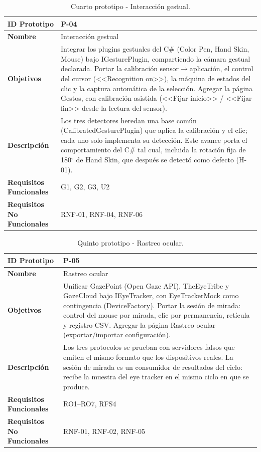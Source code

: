 \begin{table}[H]
\centering
\caption{Cuarto prototipo - Interacción gestual.}
\label{tab:prototipo-p04}
\small
\begin{tabularx}{\textwidth}{>{\bfseries}l X}
\toprule
ID Prototipo & P-04 \\ \midrule
Nombre & Interacción gestual \\ \midrule
Objetivos & Integrar los plugins gestuales del C\# (Color Pen, Hand Skin, Mouse) bajo IGesturePlugin, compartiendo la cámara gestual declarada. \newline Portar la calibración sensor$\rightarrow$aplicación, el control del cursor (<<Recognition on>>), la máquina de estados del clic y la captura automática de la selección. \newline Agregar la página Gestos, con calibración asistida (<<Fijar inicio>> / <<Fijar fin>> desde la lectura del sensor). \\ \midrule
Descripción & Los tres detectores heredan una base común (CalibratedGesturePlugin) que aplica la calibración y el clic; cada uno solo implementa su detección. Este avance porta el comportamiento del C\# tal cual, incluida la rotación fija de 180$^{\circ}$ de Hand Skin, que después se detectó como defecto (H-01). \\ \midrule
Requisitos Funcionales & G1, G2, G3, U2 \\ \midrule
Requisitos No Funcionales & RNF-01, RNF-04, RNF-06 \\ \bottomrule
\end{tabularx}
\end{table}

\begin{table}[H]
\centering
\caption{Quinto prototipo - Rastreo ocular.}
\label{tab:prototipo-p05}
\small
\begin{tabularx}{\textwidth}{>{\bfseries}l X}
\toprule
ID Prototipo & P-05 \\ \midrule
Nombre & Rastreo ocular \\ \midrule
Objetivos & Unificar GazePoint (Open Gaze API), TheEyeTribe y GazeCloud bajo IEyeTracker, con EyeTrackerMock como contingencia (DeviceFactory). \newline Portar la sesión de mirada: control del mouse por mirada, clic por permanencia, retícula y registro CSV. \newline Agregar la página Rastreo ocular (exportar/importar configuración). \\ \midrule
Descripción & Los tres protocolos se prueban con servidores falsos que emiten el mismo formato que los dispositivos reales. La sesión de mirada es un consumidor de resultados del ciclo: recibe la muestra del eye tracker en el mismo ciclo en que se produce. \\ \midrule
Requisitos Funcionales & RO1–RO7, RFS4 \\ \midrule
Requisitos No Funcionales & RNF-01, RNF-02, RNF-05 \\ \bottomrule
\end{tabularx}
\end{table}

